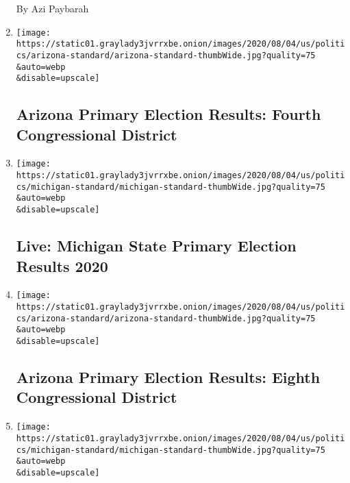 \begin{enumerate}
  By Azi Paybarah
\item
  \href{/interactive/2020/08/04/us/elections/results-arizona-house-district-4-primary-election.html}{}

  \texttt{[image: https://static01.graylady3jvrrxbe.onion/images/2020/08/04/us/politics/arizona-standard/arizona-standard-thumbWide.jpg?quality=75\\\&auto=webp\\\&disable=upscale]}

  \hypertarget{arizona-primary-election-results-fourth-congressional-district}{%
  \subsection{Arizona Primary Election Results: Fourth Congressional
  District}\label{arizona-primary-election-results-fourth-congressional-district}}
\item
  \href{/interactive/2020/08/04/us/elections/results-michigan-primary-elections.html}{}

  \texttt{[image: https://static01.graylady3jvrrxbe.onion/images/2020/08/04/us/politics/michigan-standard/michigan-standard-thumbWide.jpg?quality=75\\\&auto=webp\\\&disable=upscale]}

  \hypertarget{live-michigan-state-primary-election-results-2020}{%
  \subsection{Live: Michigan State Primary Election Results
  2020}\label{live-michigan-state-primary-election-results-2020}}
\item
  \href{/interactive/2020/08/04/us/elections/results-arizona-house-district-8-primary-election.html}{}

  \texttt{[image: https://static01.graylady3jvrrxbe.onion/images/2020/08/04/us/politics/arizona-standard/arizona-standard-thumbWide.jpg?quality=75\\\&auto=webp\\\&disable=upscale]}

  \hypertarget{arizona-primary-election-results-eighth-congressional-district}{%
  \subsection{Arizona Primary Election Results: Eighth Congressional
  District}\label{arizona-primary-election-results-eighth-congressional-district}}
\item
  \href{/interactive/2020/08/04/us/elections/results-michigan-house-district-10-primary-election.html}{}

  \texttt{[image: https://static01.graylady3jvrrxbe.onion/images/2020/08/04/us/politics/michigan-standard/michigan-standard-thumbWide.jpg?quality=75\\\&auto=webp\\\&disable=upscale]}


\end{enumerate}

